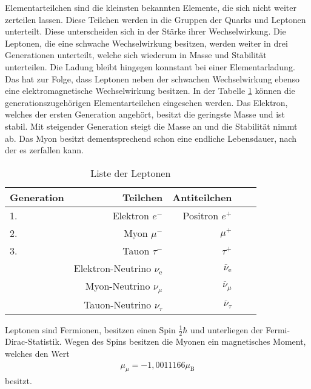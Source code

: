 Elementarteilchen sind die kleinsten bekannten Elemente, die sich nicht weiter zerteilen lassen.
Diese Teilchen werden in die Gruppen der Quarks und Leptonen unterteilt.
Diese unterscheiden sich in der Stärke ihrer Wechselwirkung.
Die Leptonen, die eine schwache Wechselwirkung besitzen, werden weiter in drei Generationen unterteilt, welche sich wiederum in Masse und Stabilität unterteilen.
Die Ladung bleibt hingegen konnstant bei einer Elementarladung.
Das hat zur Folge, dass Leptonen neben der schwachen Wechselwirkung ebenso eine elektromagnetische Wechselwirkung besitzen.
In der Tabelle \ref{tab:gen} können die generationszugehörigen Elementarteilchen eingesehen werden.
Das Elektron, welches der ersten Generation angehört, besitzt die geringste Masse und ist stabil.
Mit steigender Generation steigt die Masse an und die Stabilität nimmt ab.
Das Myon besitzt dementsprechend schon eine endliche Lebensdauer, nach der es zerfallen kann.
\begin{table}[h!]
  \centering
  \caption{Liste der Leptonen \cite{1}}
  \label{tab:gen}
  \begin{tabular}{l r r l l}
    \toprule
      Generation & Teilchen & Antiteilchen  \\
      \midrule
      1.& Elektron $e^{-}$                   &   Positron $e^{+}$    \\
      2.& Myon   $\mu^{-}$                   &          $\mu^{+}$    \\
      3.& Tauon $\tau^{-}$                   &         $\tau^{+}$    \\
      \midrule
        & Elektron-Neutrino $\nu_{\text{e}}$ & $\overline{\nu}_{\text{e}}$\\
        & Myon-Neutrino     $\nu_{\mu}$      & $\overline{\nu}_{\mu}$     \\
        & Tauon-Neutrino    $\nu_{\tau}$     & $\overline{\nu}_{\tau}$    \\
    \bottomrule
  \end{tabular}
\end{table}
\FloatBarrier

Leptonen sind Fermionen, besitzen einen Spin $\frac{1}{2}\hbar$ und unterliegen der Fermi-Dirac-Statistik.
Wegen des Spins besitzen die Myonen ein magnetisches Moment, welches den Wert
\begin{align*}
  \mu_{\mu} = -1,0011166\mu_{\text{B}}
\end{align*}
besitzt.

